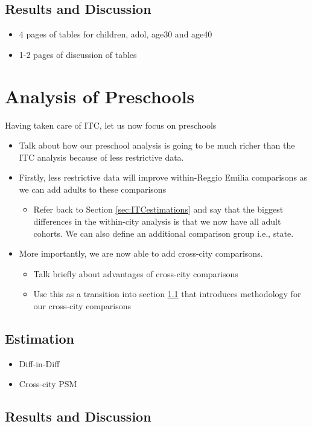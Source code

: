 \subsection{Results and Discussion} 
\begin{itemize}
	\item 4 pages of tables for children, adol, age30 and age40
	\item 1-2 pages of discussion of tables
\end{itemize}
\newpage

\section{Analysis of  Preschools} 
\label{sec:pre}
Having taken care of ITC, let us now focus on preschools
\begin{itemize}
	\item Talk about how our preschool analysis is going to be much richer than the ITC analysis because of less restrictive data.
	\item Firstly, less restrictive data will improve within-Reggio Emilia comparisons as we can add adults to these comparisons 
	\begin{itemize}
		\item Refer back to Section \ref{sec:ITCestimations} and say that the biggest differences in the within-city analysis is that we now have all adult cohorts. We can also define an additional comparison group i.e., state.
	\end{itemize}
	\item More importantly, we are now able to add cross-city comparisons.
	\begin{itemize}
		\item Talk briefly about advantages of cross-city comparisons
		\item Use this as a transition into section \ref{sec:preestimations} that introduces methodology for our cross-city comparisons
	\end{itemize}
\end{itemize}

\subsection{Estimation} \label{sec:preestimations}
\begin{itemize}
	\item Diff-in-Diff
	\item Cross-city PSM
\end{itemize}

\subsection{Results and Discussion} ~\\ ~\\



